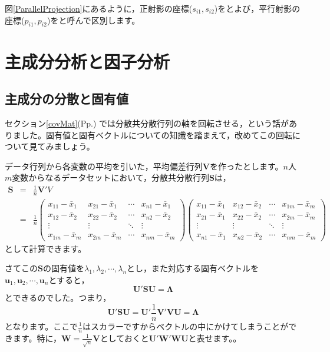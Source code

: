 \documentclass{ltjsbook}
\begin{document}
図\ref{ParallelProjection}にあるように，正射影の座標($s_{i1},s_{i2}$)をとよび，平行射影の座標($p_{i1},p_{i2}$)をと呼んで区別します。
\section{主成分分析と因子分析}
\subsection{主成分の分散と固有値}
セクション\ref{covMat}(Pp.\pageref{covMat}) では分散共分散行列の軸を回転させる，という話がありました。固有値と固有ベクトルについての知識を踏まえて，改めてこの回転について見てみましょう。

データ行列から各変数の平均を引いた，平均偏差行列$\bm{V}$を作ったとします。$n$人$m$変数からなるデータセットにおいて，分散共分散行列$\bm{S}$は，
\[\begin{array}{lll}
		\bm{S} & = & \frac{1}{n}\bm{V}'{V} \\
		       & = & \frac{1}{n}
		\begin{pmatrix} x_{11} - \bar{x}_1 & x_{21}-\bar{x}_1 & \cdots & x_{n1}-\bar{x}_1 \\
                x_{12} - \bar{x}_2 & x_{22}-\bar{x}_2 & \cdots & x_{n2}-\bar{x}_2 \\
                \vdots             & \vdots           & \ddots & \vdots           \\
                x_{1m} - \bar{x}_m & x_{2m}-\bar{x}_m & \cdots & x_{nm}-\bar{x}_m\end{pmatrix}
		\begin{pmatrix} x_{11} - \bar{x}_1 & x_{12}-\bar{x}_2 & \cdots & x_{1m}-\bar{x}_m \\
                x_{21} - \bar{x}_1 & x_{22}-\bar{x}_2 & \cdots & x_{2m}-\bar{x}_m \\
                \vdots             & \vdots           & \ddots & \vdots           \\
                x_{n1} - \bar{x}_1 & x_{n2}-\bar{x}_2 & \cdots & x_{nm}-\bar{x}_m\end{pmatrix}
	\end{array}
\]
として計算できます。

さてこの$\bm{S}$の固有値を$\lambda_1,\lambda_2,\cdots,\lambda_n$とし，また対応する固有ベクトルを$\bm{u}_1,\bm{u}_2,\cdots,\bm{u}_n$とすると，
\[ \bm{U}'\bm{SU} = \bm{\Lambda} \]
とできるのでした。つまり，
\[ \bm{U}'\bm{SU} = \bm{U}'\frac{1}{n}\bm{V}'\bm{VU} = \bm{\Lambda}\]
となります。ここで$\frac{1}{n}$はスカラーですからベクトルの中にかけてしまうことができます。特に，$\bm{W} = \frac{1}{\sqrt{n}}\bm{V}$としておくと$\bm{U}'\bm{W}'\bm{WU}$と表せます。。
\end{document}
